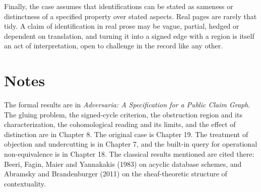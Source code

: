 \documentclass[11pt]{article}
\begin{document}
Finally, the case assumes that identifications can be stated as sameness or distinctness of a specified property over stated aspects. Real pages are rarely that tidy. A claim of identification in real prose may be vague, partial, hedged or dependent on translation, and turning it into a signed edge with a region is itself an act of interpretation, open to challenge in the record like any other.

\section*{Notes}

The formal results are in \emph{Adversaria: A Specification for a Public Claim Graph}. The gluing problem, the signed-cycle criterion, the obstruction region and its characterization, the cohomological reading and its limits, and the effect of distinction are in Chapter 8. The original case is Chapter 19. The treatment of objection and undercutting is in Chapter 7, and the built-in query for operational non-equivalence is in Chapter 18. The classical results mentioned are cited there: Beeri, Fagin, Maier and Yannakakis (1983) on acyclic database schemes, and Abramsky and Brandenburger (2011) on the sheaf-theoretic structure of contextuality.
\end{document}
